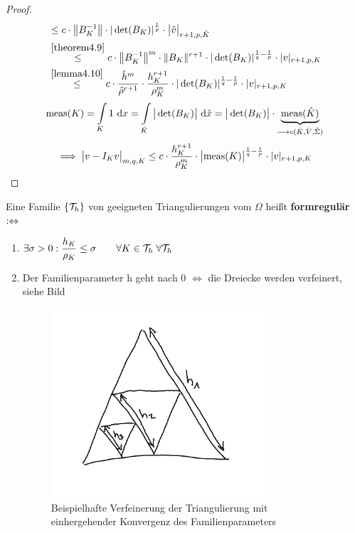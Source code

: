 \begin{proof}
\begin{align*}
&\leq c\cdot\big\Vert B_K^{-1}\big\Vert\cdot|\det(B_K)|^{\frac{1}{p}}\cdot\big|\hat{v}\big|_{r+1,p,\hat{K}}\\
&\stackrel{\ref{theorem4.9}}{\leq}
c\cdot\big\Vert B_K^{-1}\big\Vert^m\cdot\Vert B_K\Vert^{r+1}\cdot|\det(B_K)|^{\frac{1}{q}-\frac{1}{p}}\cdot |v|_{r+1,p,K}\\
&\stackrel{\ref{lemma4.10}}{\leq}
c\cdot\frac{\hat{h}^m}{\hat{\rho}^{r+1}}\cdot\frac{h_K^{r+1}}{\rho^m_K}\cdot|\det(B_K)|^{\frac{1}{q}-\frac{1}{p}}\cdot|v|_{r+1,p,K}
\end{align*}
\begin{align*}
\text{meas}(K)=\int\limits_K 1\text{ d} x=\int\limits_{\hat{K}}\big|\det(B_K)\big|\text{ d}\hat{x}=\big|\det(B_K)\big|\cdot\underbrace{\text{meas}(\hat{K})}_{\longrightarrow c(\hat{K},\hat{V},\hat{\Sigma})}
\end{align*}
\begin{align*}
\implies \big| v-I_K v\big|_{m,q,K}
\leq c\cdot\frac{h_K^{r+1}}{\rho_K^m}\cdot\big|\text{meas}(K)\big|^{\frac{1}{q}-\frac{1}{p}}\cdot|v|_{r+1,p,K}
\end{align*} 
\end{proof}

\begin{definition}\enter %
Eine Familie $\lbrace\mathcal{T}_h\rbrace$ von geeigneten Triangulierungen vom $\Omega$  heißt \textbf{formregulär}
$:\Leftrightarrow$
\begin{enumerate}[label=(\roman*)]
\item $\begin{aligned}
\exists\sigma>0:\frac{h_K}{\rho_K}\leq\sigma \qquad\forall K\in\mathcal{T}_h\;\forall\mathcal{T}_h
\end{aligned}$
\item Der Familienparameter h geht nach 0 $\iff$ die Dreiecke werden verfeinert, siehe Bild
		\begin{figure}[h!]
			\begin{center}
				\includegraphics[width=0.75\textwidth]{pics/Sketch3.png}
				\caption{Beispielhafte Verfeinerung der Triangulierung mit einhergehender Konvergenz des Familienparameters}
				\label{AbbFamilienparameterKonvergenz}
			\end{center}
		\end{figure}
\end{enumerate}
\end{definition}


